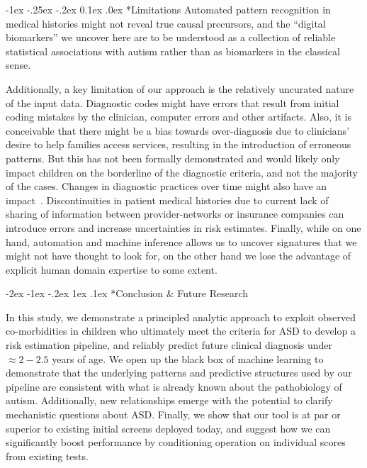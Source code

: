 \documentclass[onecolumn,,10pt]{IEEEtran}
\makeatletter
\renewcommand\section{\@startsection {section}{1}{\z@}%
  {-2ex \@plus -1ex \@minus -.2ex}%
  {1ex \@plus.1ex}%
  {\Large\bfseries\scshape}}
\renewcommand\subsection{\@startsection {section}{1}{\z@}%
  {-1ex \@plus -.25ex \@minus -.2ex}%
  {0.1ex \@plus.0ex}%
  {\fontsize{11}{12}\selectfont\bfseries\sffamily\color{DodgerBlue4}}}
\makeatother
\begin{document}
\subsection*{Limitations}
Automated pattern recognition in medical histories  might not reveal true causal precursors, and the ``digital biomarkers'' we uncover here are  to be  understood as a collection of reliable statistical associations with autism rather than as  biomarkers in the classical sense.

Additionally, a key limitation of our approach is the relatively uncurated nature of the input data. Diagnostic codes might have errors that result from initial coding mistakes by the clinician, computer errors and other artifacts.   Also, it is conceivable  that there might be a bias towards over-diagnosis due to clinicians' desire to help families access services, resulting in the introduction of erroneous patterns. But this has not been formally demonstrated and would likely only impact  children on the borderline of the diagnostic criteria, and  not the majority of the cases.  Changes in diagnostic practices over time might also have an impact~\cite{10.1001/jamapsychiatry.2019.1956}. Discontinuities in patient medical histories due to current lack of sharing of  information between provider-networks or insurance companies can introduce errors and increase uncertainties  in risk estimates.
Finally, while on one hand, automation and machine inference allows us to uncover signatures that we might not have thought to look for, on the other hand we lose the advantage of explicit human domain expertise to some extent.

\section*{Conclusion \& Future Research}


In this study, we demonstrate a principled analytic approach to exploit observed co-morbidities in children who ultimately meet the criteria for ASD to develop
a risk estimation pipeline,  and reliably predict future clinical  diagnosis  under $\approx 2-2.5$ years of age. We open up the black box of machine learning to demonstrate that the underlying patterns and predictive structures used by our pipeline  are consistent with what is already known about the pathobiology of autism. Additionally, new relationships emerge with the potential to clarify mechanistic questions about ASD. Finally, we show that our tool is at par or superior to existing initial screens deployed today, and suggest how we can significantly boost performance by conditioning operation on individual scores from existing tests.
\end{document}

